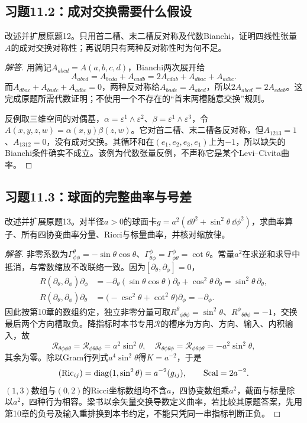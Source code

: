 \subsection*{习题11.2：成对交换需要什么假设}
改述并扩展原题12。只用首二槽、末二槽反对称及代数Bianchi，证明四线性张量$A$的成对交换对称性；再说明只有两种反对称性时为何不足。
\begin{proof}[解答]
用简记$A_{abcd}=A(a,b,c,d)$，Bianchi两次展开给
\[
 A_{abcd}=A_{bcda}+A_{cadb}
 =2A_{cdab}+A_{dbac}+A_{adbc}.
\]
而$A_{dbac}+A_{badc}+A_{adbc}=0$，两种反对称给$A_{badc}=A_{abcd}$，所以$2A_{abcd}=2A_{cdab}$。这完成原题所需代数证明；不使用一个不存在的“首末两槽随意交换”规则。

反例取三维空间的对偶基，$\alpha=\varepsilon^1\wedge\varepsilon^2$、$\beta=\varepsilon^1\wedge\varepsilon^3$，令$A(x,y,z,w)=\alpha(x,y)\beta(z,w)$。它对首二槽、末二槽各反对称，但$A_{1213}=1$、$A_{1312}=0$，没有成对交换。其循环和在$(e_1,e_2,e_3,e_1)$上为$-1$，所以缺失的Bianchi条件确实不成立。该例为代数张量反例，不声称它是某个Levi--Civita曲率。
\end{proof}

\subsection*{习题11.3：球面的完整曲率与号差}
改述并扩展原题13。对半径$a>0$的球面卡$g=a^2(\dd\theta^2+\sin^2\theta\,\dd\phi^2)$，求曲率算子、所有四协变曲率分量、Ricci与标量曲率，并核对缩放律。
\begin{proof}[解答]
非零系数为$\Gamma^\theta_{\phi\phi}=-\sin\theta\cos\theta$、$\Gamma^\phi_{\theta\phi}=\Gamma^\phi_{\phi\theta}=\cot\theta$。常量$a^2$在求逆和求导中抵消，与常数缩放不改联络一致。因为$[\partial_\theta,\partial_\phi]=0$，
\begin{align*}
 R(\partial_\theta,\partial_\phi)\partial_\phi
 &=-\partial_\theta(\sin\theta\cos\theta)\partial_\theta
   +\cos^2\theta\,\partial_\theta
 =\sin^2\theta\,\partial_\theta,\\
 R(\partial_\theta,\partial_\phi)\partial_\theta
 &=\bigl(-\csc^2\theta+\cot^2\theta\bigr)\partial_\phi
 =-\partial_\phi.
\end{align*}
因此按第10章的数组约定，独立非零分量可取$R^\theta{}_{\phi\theta\phi}=\sin^2\theta$、$R^\phi{}_{\theta\theta\phi}=-1$，交换最后两个方向槽取负。降指标时本书专用$\mathcal R$的槽序为方向、方向、输入、内积输入，故
\[
 \mathcal R_{\theta\phi\phi\theta}=\mathcal R_{\phi\theta\theta\phi}=a^2\sin^2\theta,
 \quad
 \mathcal R_{\theta\phi\theta\phi}=\mathcal R_{\phi\theta\phi\theta}=-a^2\sin^2\theta,
\]
其余为零。除以Gram行列式$a^4\sin^2\theta$得$K=a^{-2}$，于是
\[
 (\operatorname{Ric}_{ij})=\operatorname{diag}(1,\sin^2\theta)=a^{-2}(g_{ij}),
 \qquad \mathrm{Scal}=2a^{-2}.
\]
$(1,3)$数组与$(0,2)$的Ricci坐标数组均不含$a$，四协变数组乘$a^2$，截面与标量除以$a^2$，四种行为相容。梁书以余矢量交换导数定义曲率，若比较其原题答案，先用第10章的负号及输入重排换到本书约定，不能只凭同一串指标判断正负。
\end{proof}

